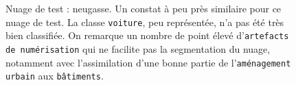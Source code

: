 \documentclass[a4paper, onecolumn, 11pt]{article}
\begin{document}
\begin{figure}[h]
    \qquad
    \caption{Nuage de test : neugasse. Un constat à peu près similaire pour ce nuage de test. La classe \texttt{voiture}, peu représentée, n'a pas été très bien classifiée. On remarque un nombre de point élevé d'\texttt{artefacts de numérisation} qui ne facilite pas la segmentation du nuage, notamment avec l'assimilation d'une bonne partie de l'\texttt{aménagement urbain} aux \texttt{bâtiments}.}
    \label{fig:neugasse}
\end{figure}
\end{document}
